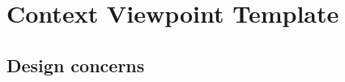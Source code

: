 \chapter{Context Viewpoint Template} \label{chp:context-viewpoint-template}
	\begin{comment}
		The Context viewpoint depicts services provided by a design subject with reference to an explicit context.
		That context is defined by reference to actors that include users and other stakeholders, which interact with
		the design subject in its environment. The Context viewpoint provides a “black box” perspective on the
		design subject.
		Services depict an inherently functional aspect or anticipated cases of use of the design subject (hence “use
		cases” in UML). Stratification of services and their descriptions in the form of scenarios of actors’
		interactions with the system provide a mechanism for adding detail. Services may also be associated with
		actors through information flows. The content and manner of information exchange with the environment
		implies additional design information and the need for additional viewpoints (see 5.10).
		A Deployment overlay to a Context view can be transformed into a Deployment view whenever the
		execution hardware platform is part of the design subject; for stand-alone software design, a Deployment
		overlay maps software entities onto externally available entities not subject of the current design effort.
		Similarly, work allocation to teams and other management perspectives are overlays in the design.
	\end{comment}
	
	\section{Design concerns} \label{s:context-viewpoint-template:design-concerns}
		\begin{comment}
			The purpose of the Context viewpoint is to identify a design subject’s offered services, its actors (users and
			other interacting stakeholders), to establish the system boundary and to effectively delineate the design
			subject’s scope of use and operation.
			Drawing a boundary separating a design subject from its environment, determining a set of services to be
			provided, and the information flows between design subject and its environment, is typically a key design
			decision. That makes this viewpoint applicable to most design efforts.
			When the system is portrayed as a black box, with internal decisions hidden, the Context view is often a
			starting point of design, showing what is to be designed functionally as the only available information
			about the design subject: a name and an associated set of externally identifiable services. Requirements
			analysis identifies these services with the specification of quality of service attributes, henceforth invoking
			many non-functional requirements. Frequently incomplete, a Context view is begun in requirements
			analysis. Work to complete this view continues during design.
		\end{comment}
		
